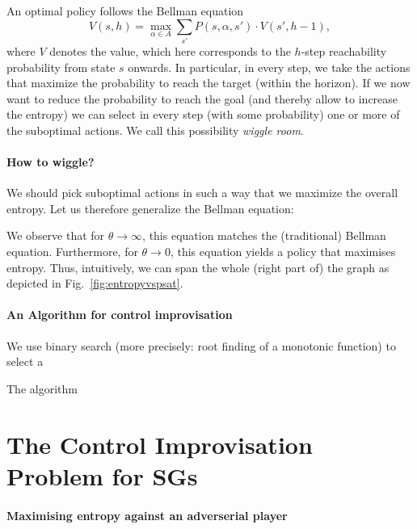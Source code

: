 \documentclass[conference]{IEEEtran}
\theoremstyle{remark}
\newcommand{\act}{\alpha}
\newcommand{\Act}{A}
\begin{document}
An optimal policy follows the Bellman equation
\[ V(s,h)  = \max_{\act \in \Act} \sum_{s'} P(s,\act,s') \cdot V(s',h-1),\]
where $V$ denotes the value, which here corresponds to the $h$-step reachability probability from state $s$ onwards.
In particular, in every step, we take the actions that maximize the probability to reach the target (within the horizon). 
If we now want to reduce the probability to reach the goal (and thereby allow to increase the entropy) we can select in every step (with some probability) one or more of the suboptimal actions. We call this possibility \emph{wiggle room}. 
\paragraph{How to wiggle?}
We should pick suboptimal actions in such a way that we maximize the overall entropy. Let us therefore generalize the Bellman equation:

We observe that for $\theta \rightarrow \infty$, this equation matches the (traditional) Bellman equation. 
Furthermore, for $\theta \rightarrow 0$, this equation yields a policy that maximises entropy.
Thus, intuitively, we can span the whole (right part of) the graph as depicted in Fig.~\ref{fig:entropyvspsat}.


\paragraph{An Algorithm for control improvisation}

We use binary search (more precisely: root finding of a monotonic function) to select a 

The algorithm 




 
\color{black}
\section{The Control Improvisation Problem for SGs}
\label{sec:sgs}
\paragraph{Maximising entropy against an adverserial player}
\end{document}
